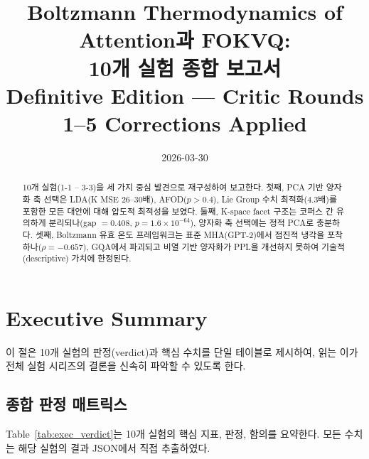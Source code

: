 \documentclass[11pt,a4paper]{article}
\title{Boltzmann Thermodynamics of Attention과 FOKVQ:\\[0.3em]
\large 10개 실험 종합 보고서\\[0.3em]
\small{Definitive Edition --- Critic Rounds 1--5 Corrections Applied}}
\author{2026-03-30}
\date{}
\begin{document}
\maketitle

\begin{abstract}
10개 실험(1-1 -- 3-3)을 세 가지 중심 발견으로 재구성하여 보고한다.
첫째, PCA 기반 양자화 축 선택은 LDA(K MSE 26--30배), AFOD($p > 0.4$), Lie Group 수치 최적화(4.3배)를 포함한 모든 대안에 대해 압도적 최적성을 보였다.
둘째, K-space facet 구조는 코퍼스 간 유의하게 분리되나(gap $= 0.408$, $p = 1.6 \times 10^{-64}$), 양자화 축 선택에는 정적 PCA로 충분하다.
셋째, Boltzmann 유효 온도 프레임워크는 표준 MHA(GPT-2)에서 점진적 냉각을 포착하나($\rho = -0.657$), GQA에서 파괴되고 비열 기반 양자화가 PPL을 개선하지 못하여 기술적(descriptive) 가치에 한정된다.
\end{abstract}

\tableofcontents
\newpage

\section{Executive Summary}

이 절은 10개 실험의 판정(verdict)과 핵심 수치를 단일 테이블로 제시하여, 읽는 이가 전체 실험 시리즈의 결론을 신속히 파악할 수 있도록 한다.

\subsection{종합 판정 매트릭스}

Table~\ref{tab:exec_verdict}는 10개 실험의 핵심 지표, 판정, 함의를 요약한다.
모든 수치는 해당 실험의 결과 JSON에서 직접 추출하였다.
\end{document}
